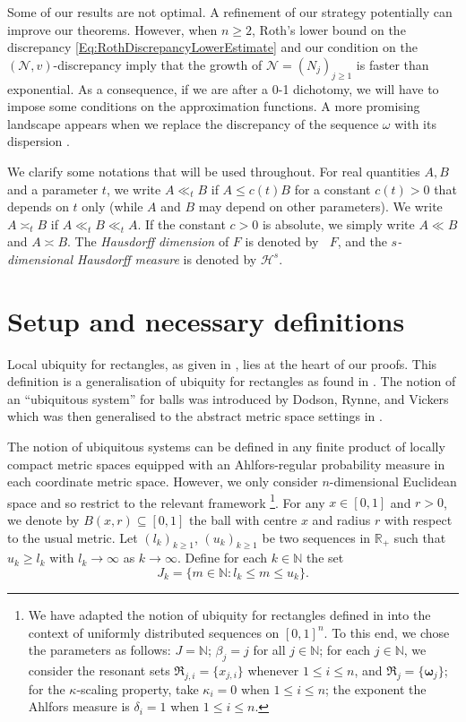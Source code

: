 \documentclass{amsart}
\theoremstyle{definition}
\newcommand{\N}{\mathbb N}%
\newcommand{\R}{\mathbb R}
\newcommand{\0}{\mbf 0}%
\newcommand{\cH}{\mathcal{H}}
\DeclareMathOperator{\dimh}{\dim_H}
\def\N{\mathbb N}
\def\R{\mathbb R}
\begin{document}
Some of our results are not optimal. A refinement of our strategy potentially can improve our theorems. However, when $n\geq 2$, Roth's lower bound on the discrepancy \eqref{Eq:RothDiscrepancyLowerEstimate} and our condition on the $(\mathcal{N},v)$-discrepancy imply that the growth of $\mathcal{N}=(N_j)_{j\geq 1}$ is faster than exponential. As a consequence, if we are after a 0-1 dichotomy, we will have to impose some conditions on the approximation functions. A more promising landscape appears when we replace the discrepancy of the sequence $\omega$ with its dispersion \cite[Section 1.1.3.]{DrmotaTichy1997}.

We clarify some notations that will be used throughout. For real quantities $A,B$ and a parameter $t$, we write $A \ll_t B$ if $A \leq c(t) B$ for a constant $c(t) > 0$ that depends on $t$ only (while $A$ and $B$ may depend on other parameters). We write  $A\asymp_{t} B$ if $A\ll_{t} B\ll_{t} A$. If the constant $c>0$ is absolute, we simply write $A\ll B$ and $A\asymp B$. The \textit{Hausdorff dimension} of $F$ is denoted by $\dimh F$, and the \textit{$s$-dimensional Hausdorff measure} is denoted by $\cH^s$.



\section{Setup and necessary definitions}\label{ubiquity}

Local ubiquity for rectangles, as given in \cite{KW23}, lies at the heart of our proofs.
This definition is a generalisation of ubiquity for rectangles as found in \cite{WW19}. The notion of an ``ubiquitous system'' for balls was introduced by Dodson, Rynne, and Vickers \cite{DRV} which was then generalised to the abstract metric space settings in \cite{BDV06}.\par

The notion of ubiquitous systems can be defined in any finite product of locally compact metric spaces equipped with an Ahlfors-regular probability measure in each coordinate metric space. 
However, we only consider $n$-dimensional Euclidean space and so restrict to the relevant framework
\footnote{ We have adapted the notion of ubiquity for rectangles defined in  \cite[Section 2.2]{KW23} into the context of uniformly distributed sequences on $[0,1]^{n}$. To this end, we chose the parameters as follows: $J = \N$; $\beta_j=j$ for all $j\in\N$; for each $j\in \N$, we consider the resonant sets $\mathfrak{R}_{j,i}=\{x_{j,i}\}$ whenever $1\leq i\leq n$, and $\mathfrak{R}_j=\{\boldsymbol{\omega}_j\}$; for the $\kappa$-scaling property, take $\kappa_i=0$ when $1\leq i \leq n$; the exponent the Ahlfors measure is $\delta_i=1$ when $1\leq i \leq n$.
}. 
For any $x\in [0,1]$ and $r>0$, we denote by $B(x,r)\subseteq [0,1]$ the ball with centre $x$ and radius $r$ with respect to the usual metric.
Let $(l_{k})_{k\geq 1}$, $(u_{k})_{k\geq 1}$ be two sequences in $\R_{+}$ such that $u_{k} \geq l_{k}$ with $l_{k} \to \infty$ as $k \to \infty$. 
Define for each $k\in\N$ the set
\begin{equation*}
J_{k}= \{ m \in \N: l_{k} \leq m \leq u_{k} \}.
\end{equation*}
\end{document}
